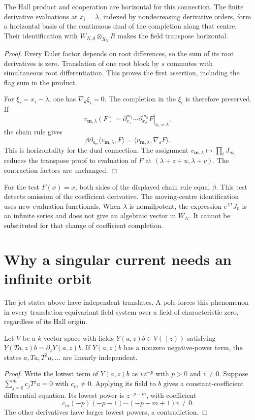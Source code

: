 \begin{proposition}\label{cyjets:prop:moving}
The Hall product and cooperation are horizontal for this connection.
The finite derivative evaluations at $x_i=\lambda$, indexed by
nondecreasing derivative orders, form a horizontal basis of the
continuous dual of the completion along that centre.
Their identification with $W_{N,d}\otimes_{R_N}R$ makes the field
transpose horizontal.
\end{proposition}
\begin{proof}
Every Euler factor depends on root differences, so the sum of its
root derivatives is zero. Translation of one root block by $s$
commutes with simultaneous root differentiation. This proves the
first assertion, including the flag sum in the product.

For $\xi_i=x_i-\lambda$, one has $\nabla_d\xi_i=0$.
The completion in the $\xi_i$ is therefore preserved. If
\[
 v_{\mathbf m,\lambda}(F)=
 \left.\partial_{x_1}^{m_1}\cdots\partial_{x_d}^{m_d}F
                                                    \right|_{x_i=\lambda},
\]
the chain rule gives
\[
 \beta\partial_{a_{\mathrm{fr}}}
       \langle v_{\mathbf m,\lambda},F\rangle
       =\langle v_{\mathbf m,\lambda},\nabla_dF\rangle.
\]
This is horizontality for the dual connection. The assignment
$v_{\mathbf m,\lambda}\mapsto\prod_iJ_{m_i}$ reduces the transpose
proof to evaluation of $F$ at $(\lambda+z+u,\lambda+v)$.
The contraction factors are unchanged.
\end{proof}

For the test $F(x)=x$, both sides of the displayed chain rule equal
$\beta$. This test detects omission of the coefficient derivative.
The moving-centre identification uses new evaluation functionals.
When $\lambda$ is nonnilpotent, the expression $e^{\lambda T}J_0$
is an infinite series and does not give an algebraic vector in $W_N$.
It cannot be substituted for that change of coefficient completion.

\section{Why a singular current needs an infinite orbit}
\label{cyjets:sec:orbits}

The jet states above have independent translates. A pole forces this
phenomenon in every translation-equivariant field system over a field
of characteristic zero, regardless of its Hall origin.

\begin{lemma}\label{cyjets:lem:orbit}
Let $V$ be a $k$-vector space with fields $Y(a,z)b\in V((z))$ satisfying
$Y(Ta,z)b=\partial_zY(a,z)b$. If $Y(a,z)b$ has a nonzero
negative-power term, the states $a,Ta,T^2a,\ldots$ are linearly
independent.
\end{lemma}
\begin{proof}
Write the lowest term of $Y(a,z)b$ as $v z^{-p}$ with $p>0$
and $v\ne0$. Suppose $\sum_{j=0}^m c_jT^ja=0$ with $c_m\ne0$.
Applying its field to $b$ gives a constant-coefficient differential
equation. Its lowest power is $z^{-p-m}$, with coefficient
\[
 c_m(-p)(-p-1)\cdots(-p-m+1)v\ne0.
\]
The other derivatives have larger lowest powers, a contradiction.
\end{proof}

